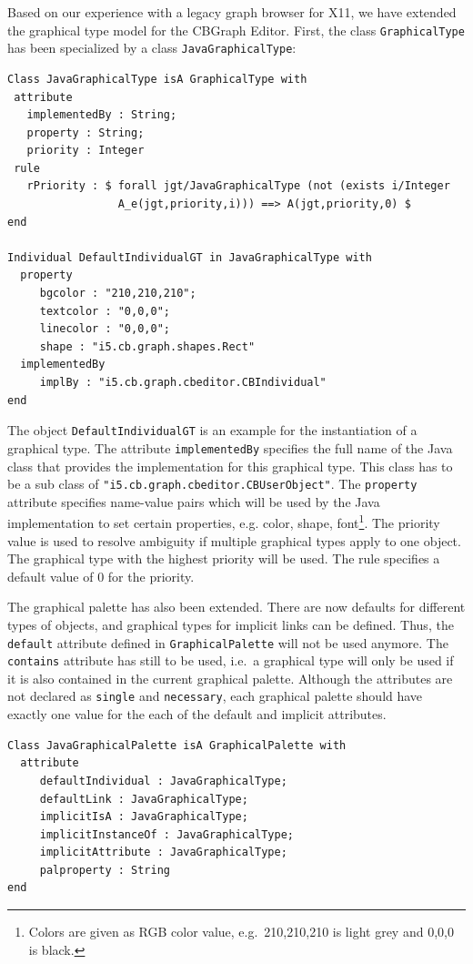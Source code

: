 Based on our experience with a legacy graph browser for X11, we have
extended the graphical type model for the CBGraph Editor. First,
the class {\tt Graphical\-Type} has been specialized by a class {\tt Java\-Graphical\-Type}:

{\small
\begin{verbatim}
Class JavaGraphicalType isA GraphicalType with
 attribute
   implementedBy : String;
   property : String;
   priority : Integer
 rule
   rPriority : $ forall jgt/JavaGraphicalType (not (exists i/Integer
                 A_e(jgt,priority,i))) ==> A(jgt,priority,0) $
end

Individual DefaultIndividualGT in JavaGraphicalType with
  property
     bgcolor : "210,210,210";
     textcolor : "0,0,0";
     linecolor : "0,0,0";
     shape : "i5.cb.graph.shapes.Rect"
  implementedBy
     implBy : "i5.cb.graph.cbeditor.CBIndividual"
end
\end{verbatim}
}

The object {\tt DefaultIndividualGT} is an example for the instantiation
of a graphical type.
The attribute {\tt implementedBy} specifies the full name of the Java class
that provides the implementation for this graphical type. This class
has to be a sub class of \verb+"i5.cb.graph.cbeditor.CBUserObject"+.
The {\tt property} attribute specifies name-value pairs which will
be used by the Java implementation to set certain properties, e.g.
color, shape, font\footnote{Colors are given as RGB color value, e.g.\ 210,210,210
is light grey and 0,0,0 is black.}.
The priority value is used to resolve ambiguity
if multiple graphical types apply to one object. The graphical type
with the highest priority will be used. The rule specifies a default
value of 0 for the priority.

The graphical palette has also been extended. There are now defaults
for different types of objects, and graphical types for implicit
links can be defined. Thus, the {\tt default} attribute defined
in {\tt Graphical\-Palette} will not be used anymore. The {\tt contains}
attribute has still to be used, i.e.\ a graphical type
will only be used if it is also contained in the current
graphical palette. Although the attributes are not declared as
{\tt single} and {\tt necessary}, each graphical palette should
have exactly one value for the each of the default and implicit attributes.

{\small
\begin{verbatim}
Class JavaGraphicalPalette isA GraphicalPalette with
  attribute
     defaultIndividual : JavaGraphicalType;
     defaultLink : JavaGraphicalType;
     implicitIsA : JavaGraphicalType;
     implicitInstanceOf : JavaGraphicalType;
     implicitAttribute : JavaGraphicalType;
     palproperty : String
end
\end{verbatim}
}

